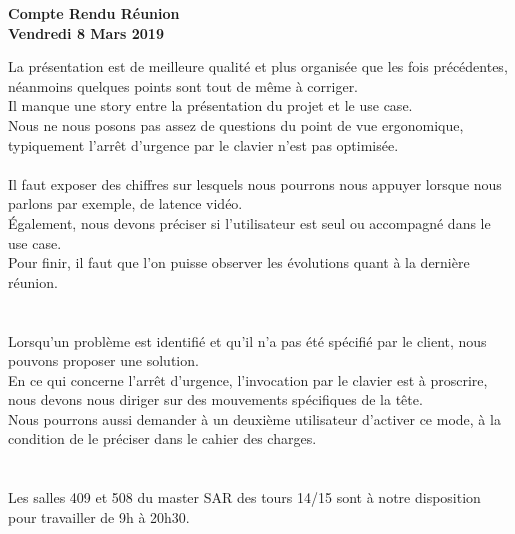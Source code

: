 \documentclass[]{article}
\begin{document}
\pagestyle{fancy}
\renewcommand\headrulewidth{1pt}
\renewcommand\footrulewidth{1pt}

\begin{center}
\large{\textbf{Compte Rendu Réunion \\ Vendredi 8 Mars 2019 \bigbreak}}
\end{center}
	

La présentation est de meilleure qualité et plus organisée que les fois précédentes, néanmoins quelques points sont tout de même à corriger.\\
Il manque une story entre la présentation du projet et le use case.\\
Nous ne nous posons pas assez de questions du point de vue ergonomique, typiquement l'arrêt d'urgence par le clavier n'est pas optimisée.\\
\\

Il faut exposer des chiffres sur lesquels nous pourrons nous appuyer lorsque nous parlons par exemple, de latence vidéo.\\
Également, nous devons préciser si l'utilisateur est seul ou accompagné dans le use case.\\
Pour finir, il faut que l'on puisse observer les évolutions quant à la dernière réunion. \\
\\
\\
Lorsqu’un problème est identifié et qu'il n'a pas été spécifié par le client, nous pouvons proposer une solution.\\
En ce qui concerne l'arrêt d'urgence, l’invocation par le clavier est à proscrire, nous devons nous diriger sur des mouvements spécifiques de la tête. \\
Nous pourrons aussi demander à un deuxième utilisateur d'activer ce mode, à la condition de le préciser dans le cahier des charges.\\
\\
\\
Les salles 409 et 508 du master SAR des tours 14/15 sont à notre disposition pour travailler de 9h à 20h30.
\end{document}
